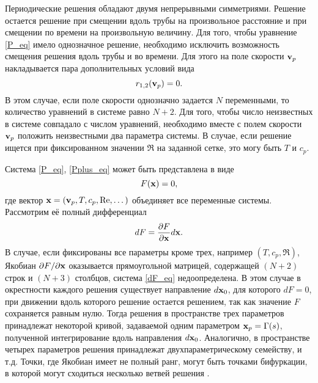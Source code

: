 Периодические решения обладают двумя непрерывными симметриями. Решение остается решение при смещении вдоль трубы на произвольное расстояние и при смещении по времени на произвольную величину. Для того, чтобы уравнение \eqref{P_eq} имело однозначное решение, необходимо исключить возможность смещения решения вдоль трубы и во времени. Для этого на поле скорости $\mathbf{v}_p$ накладывается пара дополнительных условий вида 
\begin{equation}\label{Pplus_eq}
r_{1,2}(\mathbf{v}_p) = 0.
\end{equation}
В этом случае, если поле скорости однозначно задается $N$ переменными, то количество уравнений в системе равно $N+2$. Для того, чтобы число неизвестных в системе совпадало с числом уравнений, необходимо вместе с полем скорости $\mathbf{v}_p$ положить неизвестными два параметра системы. В случае, если решение ищется при фиксированном значении $\Re$ на заданной сетке, это могу быть $T$ и $c_p$. 

Система \eqref{P_eq}, \eqref{Pplus_eq} может быть представлена в виде 
\begin{equation}\label{F_eq}
F(\mathbf{x}) = 0, 
\end{equation}
где вектор $\mathbf{x} = (\mathbf{v}_p, T, c_p, \operatorname{Re}, \dots)$ объединяет все переменные системы. Рассмотрим её полный дифференциал
\begin{equation}\label{dF_eq}
dF = \frac{\partial F}{\partial \mathbf{x}}d\mathbf{x}.
\end{equation}
В случае, если фиксированы все параметры кроме трех, например $(T, c_p, \Re)$, Якобиан ${\partial F}/{\partial \mathbf{x}}$ оказывается прямоугольной матрицей, содержащей $(N+2)$ строк и $(N+3)$ столбцов, система \eqref{dF_eq} недоопределена. В этом случае в окрестности каждого решения существует направление $d\mathbf{x}_0$, для которого $dF = 0$, при движении вдоль которого решение остается решением, так как значение $F$ сохраняется равным нулю. Тогда решения в пространстве трех параметров принадлежат некоторой кривой, задаваемой одним параметром $\mathbf{x}_p = \Gamma(s)$, полученной интегрирование вдоль направления $d\mathbf{x}_0$. Аналогично, в пространстве четырех параметров решения принадлежат двухпараметрическому семейству, и т.д. Точки, где Якобиан имеет не полный ранг, могут быть точками бифуркации, в которой могут сходиться несколько ветвей решения \cite{Sanchez2004}. 

